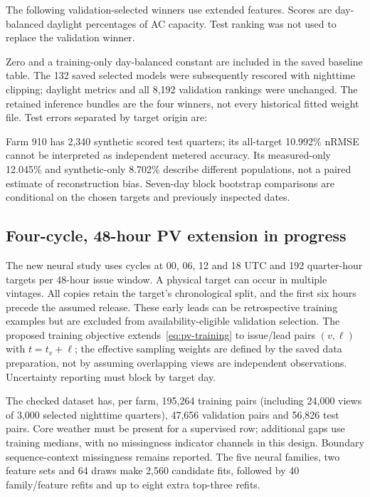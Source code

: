 The following validation-selected winners use extended features. Scores are
day-balanced daylight percentages of AC capacity. Test ranking was not used
to replace the validation winner.

Zero and a training-only day-balanced constant are included in the saved
baseline table. The 132 saved selected models were subsequently rescored with
nighttime clipping; daylight metrics and all 8,192 validation rankings were
unchanged. The retained inference bundles are the four winners, not every
historical fitted weight file. Test errors separated by target origin are:

Farm 910 has 2,340 synthetic scored test quarters; its all-target 10.992\%
nRMSE cannot be interpreted as independent metered accuracy. Its measured-only
12.045\% and synthetic-only 8.702\% describe different populations, not a paired
estimate of reconstruction bias. Seven-day block bootstrap comparisons are
conditional on the chosen targets and previously inspected dates.

\subsection{Four-cycle, 48-hour PV extension in progress}
The new neural study uses cycles at 00, 06, 12 and 18 UTC and 192 quarter-hour
targets per 48-hour issue window. A physical target can occur in multiple
vintages. All copies retain the target's chronological split, and the first
six hours precede the assumed release. These early leads can be retrospective
training examples but are excluded from availability-eligible validation
selection. The proposed training objective extends~\eqref{eq:pv-training} to
issue/lead pairs $(v,\ell)$ with $t=t_v+\ell$; the effective sampling weights
are defined by the saved data preparation, not by assuming overlapping views
are independent observations. Uncertainty reporting must block by target day.

The checked dataset has, per farm, 195,264 training pairs (including 24,000 views
of 3,000 selected nighttime quarters), 47,656 validation pairs and 56,826 test
pairs. Core weather must be present for a supervised row; additional gaps use
training medians, with no missingness indicator channels in this design.
Boundary sequence-context missingness remains reported. The five neural
families, two feature sets and 64 draws make 2,560 candidate fits, followed by
40 family/feature refits and up to eight extra top-three refits.

